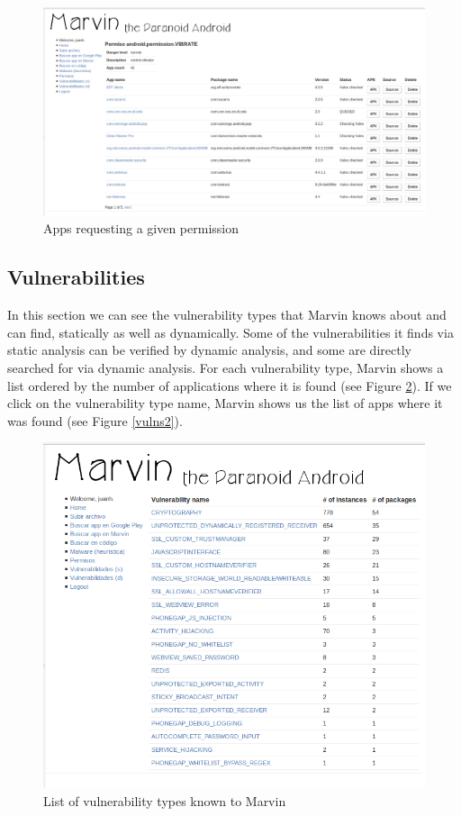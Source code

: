 \documentclass[11pt]{article}
\begin{document}
\begin{figure}[H]
\begin{center}
\includegraphics[width=\textwidth]{graphics/marvin_permissions2.png}
\caption{Apps requesting a given permission} \label{appsbyperm}
\end{center}
\end{figure}

\subsection{Vulnerabilities}

In this section we can see the vulnerability types that Marvin knows about and can find, statically as well as dynamically. Some of the vulnerabilities it finds via static analysis can be verified by dynamic analysis, and some are directly searched for via dynamic analysis. For each vulnerability type, Marvin shows a list ordered by the number of applications where it is found (see Figure \ref{vulns}). If we click on the vulnerability type name, Marvin shows us the list of apps where it was found (see Figure \ref{vulns2}).

\begin{figure}[H]
\begin{center}
\includegraphics[width=\textwidth]{graphics/marvin_vulns.png}
\caption{List of vulnerability types known to Marvin} \label{vulns}
\end{center}
\end{figure}
\end{document}
